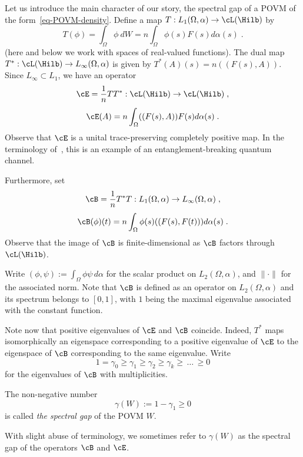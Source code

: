 Let us introduce the main character of our story, the spectral gap of a POVM of the form~\eqref{eq-POVM-density}. Define a map $T: L_1(\Omega, \alpha) \to \cL(\Hilb)$ by
\[
T(\phi)= \int_\Omega \phi\ dW = n\int_\Omega \phi(s) F(s) d\alpha(s)\;.
\]
(here and below we work with spaces of real-valued functions). The dual map $T^*: \cL(\Hilb) \to L_{\infty} (\Omega, \alpha)$ is given by $T^*(A)(s) = n((F(s),A))$. Since $L_\infty \subset L_1$, we have an operator
\[
\cE= \frac{1}{n}TT^*: \cL(\Hilb) \to \cL(\Hilb)\;,
\]
\begin{equation}\label{eq-e}
\cE(A) = n\int_{\Omega} ((F(s),A))F(s) d\alpha(s)\;.
\end{equation}
Observe that $\cE$ is a unital trace-preserving completely positive map. In the terminology of~\cite[Example~5.4]{Hayashi}, this is an example of an entanglement-breaking quantum channel.

Furthermore, set
\[
\cB=\frac{1}{n}T^*T: L_1(\Omega,\alpha) \to L_\infty(\Omega,\alpha)\;,
\]
\begin{equation}\label{eq-b}
\cB(\phi)(t)= n\int_\Omega \phi(s)((F(s),F(t))) d\alpha(s)\;.
\end{equation}
Observe that the image of $\cB$ is finite-dimensional as $\cB$ factors through $\cL(\Hilb)$.

Write $(\phi,\psi):= \int_\Omega \phi\psi\, d\alpha$ for the scalar product on $L_2(\Omega,\alpha)$, and $\|\cdot\|$ for the associated norm. Note that $\cB$ is defined as an operator on $L_2(\Omega,\alpha)$ and its spectrum belongs to $[0,1]$, with $1$ being the maximal eigenvalue associated with the constant function.

Note now that positive eigenvalues of $\cE$ and $\cB$ coincide. Indeed, $T^*$ maps isomorphically an eigenspace corresponding to a positive eigenvalue of $\cE$ to the eigenspace of $\cB$ corresponding to the same eigenvalue. Write
\[
1=\gamma_0 \geq \gamma_1 \geq \gamma_2 \geq \gamma_k
\geq\,\dots\,\geq 0
\]
for the eigenvalues of $\cB$ with multiplicities.

\begin{defi}\label{def-gap}
The non-negative number
\[
\gamma(W):= 1-\gamma_1\geq 0
\]
is called \emph{the spectral gap} of the POVM $W$.
\end{defi}

With slight abuse of terminology, we sometimes refer to $\gamma(W)$ as the spectral gap of the operators $\cB$ and $\cE$.

